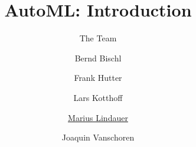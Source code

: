 




\title[AutoML: Big Picture]{AutoML: Introduction}
\subtitle{The Team}
\author[Marius Lindauer]{Bernd Bischl \and Frank Hutter \and Lars Kotthoff\newline \and \underline{Marius Lindauer} \and Joaquin Vanschoren}
\institute{}
\date{}






	\maketitle


